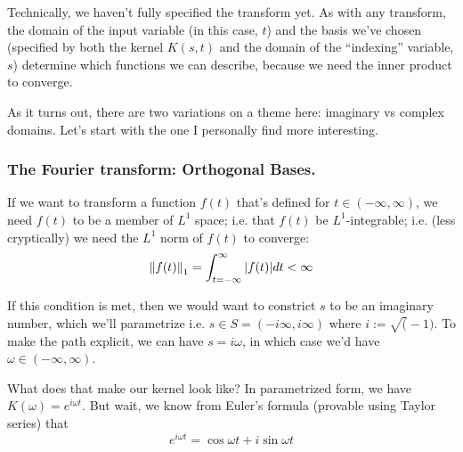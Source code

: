 \documentclass[../main/main.tex]{subfiles}
\begin{document}
Technically, we haven't fully specified the transform yet.
As with any transform, the domain of the input variable 
(in this case, \(t\)) and the basis we've chosen
(specified by both the kernel \(K(s,t)\) and the domain of
the ``indexing'' variable, \(s\)) determine which functions
we can describe, because we need the inner product 
 to converge.\par

As it turns out, there are two variations on a theme here:
imaginary vs complex domains.
Let's start with the one I personally find more interesting.

\subsubsection{The Fourier transform: Orthogonal Bases.}

If we want to transform a function \(f(t)\) that's defined
for \(t \in (-\infty, \infty)\), we need \(f(t)\) to be a member
of \(L^1\) space; i.e. that \(f(t)\) be \(L^1\)-integrable; 
i.e. (less cryptically) we need the \(L^1\) norm of \(f(t)\)
to converge:
\[\norm{f(t)}_1 = 
  \int_{t=-\infty}^{\infty} \abs{f(t)} dt < \infty \]

If this condition is met, then we would want to constrict
\(s\) to be an imaginary number, which we'll parametrize
i.e. \(s \in S = (-i\infty, i\infty)\) 
where \(i := \sqrt(-1)\).
To make the path explicit, we can have \(s = i\omega\),
in which case we'd have \(\omega \in (-\infty, \infty)\).\par

What does that make our kernel look like?
In parametrized form, we have \(K(\omega) = e^{i\omega t}\).
But wait, we know from Euler's formula
(provable using Taylor series) that
\[e^{i\omega t} = \cos{\omega t} + i\sin{\omega t} \]
\end{document}
